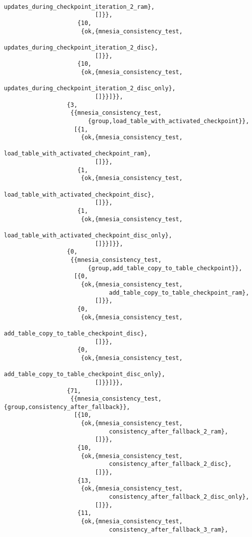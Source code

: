 \begin{verbatim}
                              updates_during_checkpoint_iteration_2_ram},
                          []}},
                     {10,
                      {ok,{mnesia_consistency_test,
                              updates_during_checkpoint_iteration_2_disc},
                          []}},
                     {10,
                      {ok,{mnesia_consistency_test,
                              updates_during_checkpoint_iteration_2_disc_only},
                          []}}]}},
                  {3,
                   {{mnesia_consistency_test,
                        {group,load_table_with_activated_checkpoint}},
                    [{1,
                      {ok,{mnesia_consistency_test,
                              load_table_with_activated_checkpoint_ram},
                          []}},
                     {1,
                      {ok,{mnesia_consistency_test,
                              load_table_with_activated_checkpoint_disc},
                          []}},
                     {1,
                      {ok,{mnesia_consistency_test,
                              load_table_with_activated_checkpoint_disc_only},
                          []}}]}},
                  {0,
                   {{mnesia_consistency_test,
                        {group,add_table_copy_to_table_checkpoint}},
                    [{0,
                      {ok,{mnesia_consistency_test,
                              add_table_copy_to_table_checkpoint_ram},
                          []}},
                     {0,
                      {ok,{mnesia_consistency_test,
                              add_table_copy_to_table_checkpoint_disc},
                          []}},
                     {0,
                      {ok,{mnesia_consistency_test,
                              add_table_copy_to_table_checkpoint_disc_only},
                          []}}]}},
                  {71,
                   {{mnesia_consistency_test,{group,consistency_after_fallback}},
                    [{10,
                      {ok,{mnesia_consistency_test,
                              consistency_after_fallback_2_ram},
                          []}},
                     {10,
                      {ok,{mnesia_consistency_test,
                              consistency_after_fallback_2_disc},
                          []}},
                     {13,
                      {ok,{mnesia_consistency_test,
                              consistency_after_fallback_2_disc_only},
                          []}},
                     {11,
                      {ok,{mnesia_consistency_test,
                              consistency_after_fallback_3_ram},

\end{verbatim}
